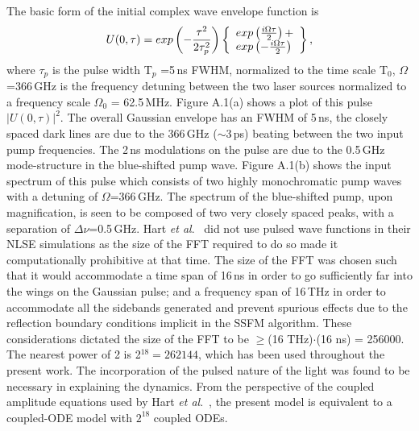 The basic form of the initial complex wave envelope function is 
\begin {equation}
U(0,\tau) = exp \left( - {\tau^2 \over 2\tau_p^2} \right)
\left\{ 
\begin{array}{l}
exp\left( {i\Omega\tau \over 2} \right) + \\
exp\left( - {i\Omega\tau \over 2} \right)
\end{array}
\right\} ,
\end{equation}
where $\tau_p$ is the pulse width T$_p$ =5\,ns FWHM, normalized to the time scale 
T$_0$, $\Omega$=366\,GHz is the frequency detuning between the two laser 
sources normalized to a frequency scale $\Omega_0$ = 62.5\,MHz.  Figure A.1(a) 
shows a plot of this pulse $|U(0,\tau)|^2$. The overall Gaussian envelope 
has an FWHM of 5\,ns, the closely spaced dark lines are due to the 366\,GHz 
($\sim$3\,ps) beating between the two input pump frequencies. The 2\,ns 
modulations on the pulse are due to the 0.5\,GHz mode-structure in the 
blue-shifted pump wave. Figure A.1(b) shows the input spectrum of this pulse 
which consists of two highly monochromatic pump waves with a detuning of 
$\Omega$=366\,GHz. The spectrum of the blue-shifted pump, upon magnification, 
is seen to be composed of two very closely spaced peaks, with a separation of 
$\Delta\nu$=0.5\,GHz. Hart {\it et al}.\ \cite{hart1} did not use pulsed 
wave functions in their NLSE simulations as the size of the FFT required to do 
so made it computationally prohibitive at that time. The size of the FFT was 
chosen such that it would accommodate a time span of 16\,ns in order to go 
sufficiently far into the wings on the Gaussian pulse; and a frequency span of 
16\,THz in order to accommodate all the sidebands generated and prevent 
spurious effects due to the reflection boundary conditions implicit in the 
SSFM algorithm. These considerations dictated the size of the FFT to be 
$\geq$(16 THz)$\cdot$(16 ns) = 256000. The nearest power of 2 is 
2$^{18} = 262144$, which has been used throughout the present work. The 
incorporation of the pulsed nature of the light was found to be necessary in 
explaining the dynamics. From the perspective of the coupled amplitude 
equations used by Hart {\it et al}.\ \cite{hart1}, the present model is equivalent 
to a coupled-ODE model with $2^{18}$ coupled ODEs. 

